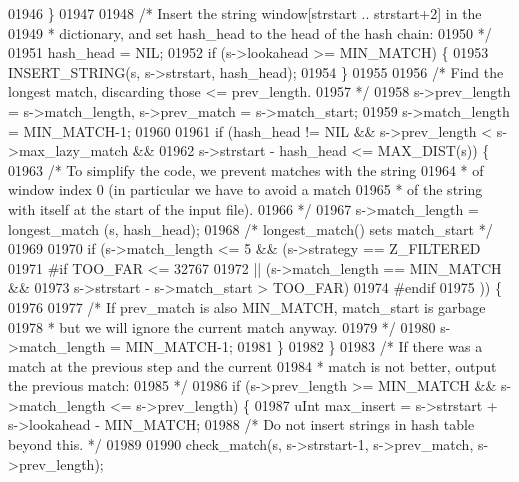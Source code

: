 \begin{DoxyCode}
{{{{{{01946         \}
01947 
01948         \textcolor{comment}{/* Insert the string window[strstart .. strstart+2] in the}
01949 \textcolor{comment}{         * dictionary, and set hash\_head to the head of the hash chain:}
01950 \textcolor{comment}{         */}
01951         hash\_head = NIL;
01952         \textcolor{keywordflow}{if} (s->lookahead >= MIN\_MATCH) \{
01953             INSERT\_STRING(s, s->strstart, hash\_head);
01954         \}
01955 
01956         \textcolor{comment}{/* Find the longest match, discarding those <= prev\_length.}
01957 \textcolor{comment}{         */}
01958         s->prev\_length = s->match\_length, s->prev\_match = s->match\_start;
01959         s->match\_length = MIN\_MATCH-1;
01960 
01961         \textcolor{keywordflow}{if} (hash\_head != NIL && s->prev\_length < s->max\_lazy\_match &&
01962             s->strstart - hash\_head <= MAX\_DIST(s)) \{
01963             \textcolor{comment}{/* To simplify the code, we prevent matches with the string}
01964 \textcolor{comment}{             * of window index 0 (in particular we have to avoid a match}
01965 \textcolor{comment}{             * of the string with itself at the start of the input file).}
01966 \textcolor{comment}{             */}
01967             s->match\_length = longest\_match (s, hash\_head);
01968             \textcolor{comment}{/* longest\_match() sets match\_start */}
01969 
01970             \textcolor{keywordflow}{if} (s->match\_length <= 5 && (s->strategy == Z\_FILTERED
01971 #\textcolor{keywordflow}{if} TOO\_FAR <= 32767
01972                 || (s->match\_length == MIN\_MATCH &&
01973                     s->strstart - s->match\_start > TOO\_FAR)
01974 #endif
01975                 )) \{
01976 
01977                 \textcolor{comment}{/* If prev\_match is also MIN\_MATCH, match\_start is garbage}
01978 \textcolor{comment}{                 * but we will ignore the current match anyway.}
01979 \textcolor{comment}{                 */}
01980                 s->match\_length = MIN\_MATCH-1;
01981             \}
01982         \}
01983         \textcolor{comment}{/* If there was a match at the previous step and the current}
01984 \textcolor{comment}{         * match is not better, output the previous match:}
01985 \textcolor{comment}{         */}
01986         \textcolor{keywordflow}{if} (s->prev\_length >= MIN\_MATCH && s->match\_length <= s->prev\_length) \{
01987             uInt max\_insert = s->strstart + s->lookahead - MIN\_MATCH;
01988             \textcolor{comment}{/* Do not insert strings in hash table beyond this. */}
01989 
01990             check\_match(s, s->strstart-1, s->prev\_match, s->prev\_length);
}}}}}}
\end{DoxyCode}
